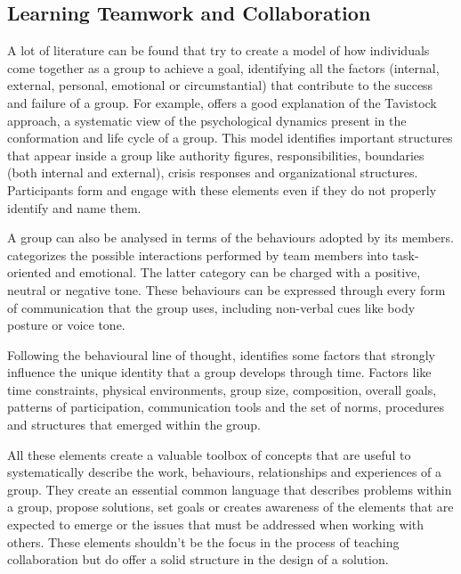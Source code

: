 \subsection{Learning Teamwork and Collaboration \label{sec:2-1-4}}

A lot of literature can be found that try to create a model of how individuals come together as a group to achieve a goal, identifying all the factors (internal, external, personal, emotional or circumstantial) that contribute to the success and failure of a group. For example,
\textcite{bion_2003} offers a good explanation of the Tavistock approach, a systematic view of the psychological dynamics present in the conformation and life cycle of a group. This model identifies important structures that appear inside a group like authority figures,
responsibilities, boundaries (both internal and external), crisis responses and organizational structures. Participants form and engage with these elements even if they do not properly identify and name them.

A group can also be analysed in terms of the behaviours adopted by its members. \textcite{bales_1970} categorizes the possible interactions performed by team members into task-oriented and emotional. The latter category can be charged with a positive, neutral or negative tone.
These behaviours can be expressed through every form of communication that the group uses, including non-verbal cues like body posture or voice tone.

Following the behavioural line of thought, \textcite{knowles_1982} identifies some factors that strongly influence the unique identity that a group develops through time. Factors like time constraints, physical environments, group size, composition, overall goals, patterns of
participation, communication tools and the set of norms, procedures and structures that emerged within the group.

All these elements create a valuable toolbox of concepts that are useful to systematically describe the work, behaviours, relationships and experiences of a group. They create an essential common language that describes problems within a group, propose solutions, set goals or
creates awareness of the elements that are expected to emerge or the issues that must be addressed when working with others. These elements shouldn't be the focus in the process of teaching collaboration but do offer a solid structure in the design of a solution.


